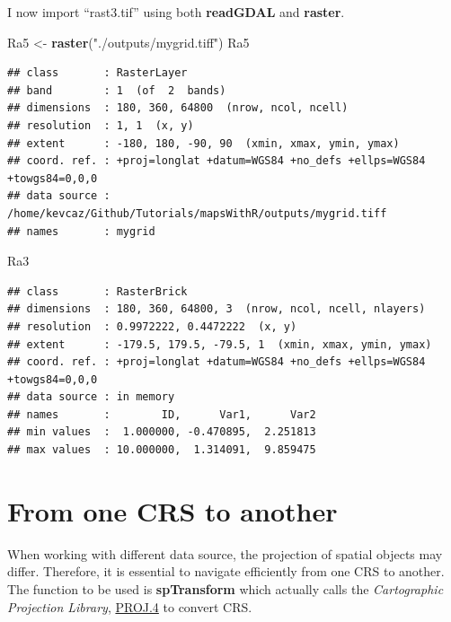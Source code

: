 \documentclass[]{report}
\newenvironment{Shaded}{\begin{snugshade}}{\end{snugshade}}
\newcommand{\KeywordTok}[1]{\textcolor[rgb]{0.13,0.29,0.53}{\textbf{#1}}}
\newcommand{\NormalTok}[1]{#1}
\newcommand{\StringTok}[1]{\textcolor[rgb]{0.31,0.60,0.02}{#1}}
\begin{document}
I now import ``rast3.tif'' using both \textbf{readGDAL} and
\textbf{raster}.

\begin{Shaded}
\begin{Highlighting}[]
\NormalTok{Ra5 <-}\StringTok{ }\KeywordTok{raster}\NormalTok{(}\StringTok{"./outputs/mygrid.tiff"}\NormalTok{)}
\NormalTok{Ra5}
\end{Highlighting}
\end{Shaded}

\begin{verbatim}
## class       : RasterLayer 
## band        : 1  (of  2  bands)
## dimensions  : 180, 360, 64800  (nrow, ncol, ncell)
## resolution  : 1, 1  (x, y)
## extent      : -180, 180, -90, 90  (xmin, xmax, ymin, ymax)
## coord. ref. : +proj=longlat +datum=WGS84 +no_defs +ellps=WGS84 +towgs84=0,0,0 
## data source : /home/kevcaz/Github/Tutorials/mapsWithR/outputs/mygrid.tiff 
## names       : mygrid
\end{verbatim}

\begin{Shaded}
\begin{Highlighting}[]
\NormalTok{Ra3}
\end{Highlighting}
\end{Shaded}

\begin{verbatim}
## class       : RasterBrick 
## dimensions  : 180, 360, 64800, 3  (nrow, ncol, ncell, nlayers)
## resolution  : 0.9972222, 0.4472222  (x, y)
## extent      : -179.5, 179.5, -79.5, 1  (xmin, xmax, ymin, ymax)
## coord. ref. : +proj=longlat +datum=WGS84 +no_defs +ellps=WGS84 +towgs84=0,0,0 
## data source : in memory
## names       :        ID,      Var1,      Var2 
## min values  :  1.000000, -0.470895,  2.251813 
## max values  : 10.000000,  1.314091,  9.859475
\end{verbatim}

\hypertarget{from-one-crs-to-another}{%
\section{From one CRS to another}\label{from-one-crs-to-another}}

When working with different data source, the projection of spatial
objects may differ. Therefore, it is essential to navigate efficiently
from one CRS to another. The function to be used is \textbf{spTransform}
which actually calls the \emph{Cartographic Projection Library},
\href{https://trac.osgeo.org/proj/}{PROJ.4} to convert CRS.
\end{document}

